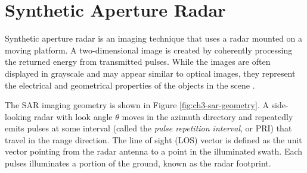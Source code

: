 \section{Synthetic Aperture Radar}
\label{CHAP:3-sar}


Synthetic aperture radar is an imaging technique that uses a radar mounted on a moving platform. A two-dimensional image is created by coherently processing the returned energy from transmitted pulses. While the images are often displayed in grayscale and may appear similar to optical images, they represent the electrical and geometrical properties of the objects in the scene \cite{Simons2007InterferometricSyntheticAperture}.


The SAR imaging geometry is shown in Figure \ref{fig:ch3-sar-geometry}. A side-looking radar with look angle $\theta$
moves in the azimuth directory and repeatedly emits pulses at some interval (called the \emph{pulse repetition interval}, or PRI) that travel in the range direction.
The line of sight (LOS) vector is defined as the unit vector pointing from the radar antenna to a point in the illuminated swath.
Each pulses illuminates a portion of the ground, known as the radar footprint.


